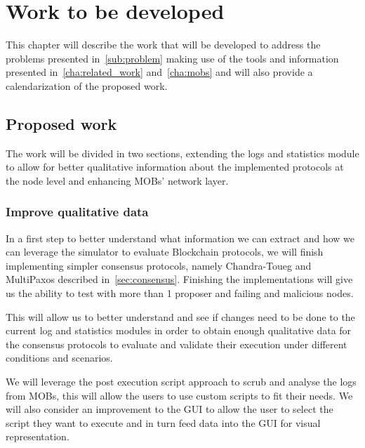 
%

\chapter{Work to be developed}\label{cha:work_to_be_developed}

This chapter will describe the work that will be developed to address the
problems presented in~\ref{sub:problem} making use of the tools and information
presented in~\ref{cha:related_work} and~\ref{cha:mobs} and will also provide
a calendarization of the proposed work.

\section{Proposed work}\label{sub:sub_proposed_work}

The work will be divided in two sections, extending the logs and statistics 
module to allow for better qualitative
information about the implemented protocols at the node level and enhancing MOBs' network layer.

\subsection{Improve qualitative data}\label{subsec:improve_qualitative_data}

In a first step to better understand what information we can extract and how
we can leverage the simulator to evaluate Blockchain protocols, we will finish implementing
simpler consensus protocols, namely Chandra-Toueg and MultiPaxos described in~\ref{sec:consensus}.
Finishing the implementations will give us the ability to test with more than 1 proposer and
failing and malicious nodes.

This will allow us to better understand and see if changes
need to be done to the current log and statistics modules in order to obtain enough qualitative
data for the consensus protocols to evaluate and validate their execution under different
conditions and scenarios.

We will leverage the post execution script approach to scrub and analyse the logs from MOBs,
this will allow the users to use custom scripts to fit their needs. We will also consider an
improvement to the GUI to allow the user to select the script they want to execute and in turn
feed data into the GUI for visual representation.

